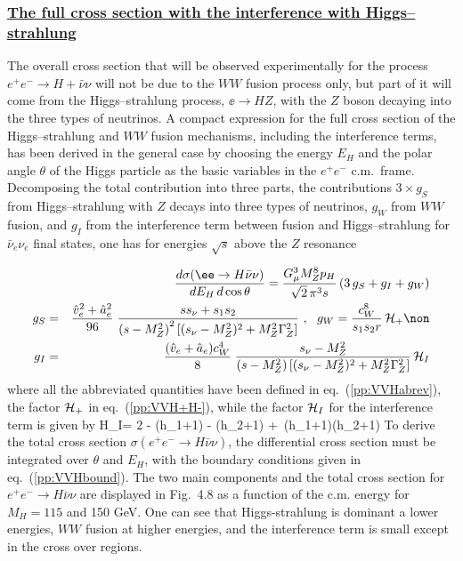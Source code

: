 \subsubsection*{\underline{The full cross section with the interference with 
Higgs--strahlung}}

The overall cross section that will be observed experimentally for  the process
$e^+e^- \to H\!+\!\bar\nu\nu$ will not be due to the $WW$ fusion process only,
but  part of it will come from the Higgs--strahlung  process,  $\ee \to HZ$,
with the $Z$ boson decaying into the three types of neutrinos.  A compact
expression for the full cross section of the Higgs--strahlung and $WW$ fusion 
mechanisms, including the interference terms,  has been derived in the general 
case by choosing the energy $E_H$ and the polar angle $\theta$ of the Higgs 
particle as the basic variables in the $e^+e^-$ c.m.\ frame. Decomposing  the
total contribution into three parts,  the contributions $3\times{g}_S$  from
Higgs--strahlung with $Z$ decays into three types of neutrinos, ${g}_W$
from $WW$ fusion, and ${g}_I$ from the interference term between  fusion
and Higgs--strahlung for $\bar\nu_e\nu_e$ final states, one has  for energies
$\sqrt{s}$ above the $Z$ resonance \cite{VVH-Altarelli,VVH-Kilian}

\begin{eqnarray}
&&  \frac{d\sigma(\ee \to H\bar\nu\nu)}{dE_H\,d\cos\theta}
  = \frac{G_\mu^3 M_Z^8p_H}{\sqrt2\,\pi^3s}
  \left(3\,g_S + g_I + g_W \right) \\
g_S &=& \frac{\hat{v}_e^2+\hat{a}_e^2}{96}\; \frac{ss_\nu + s_1s_2}
{\left(s-M_Z^2\right)^2 \left[(s_\nu-M_Z^2)^2 + M_Z^2\Gamma_Z^2\right]} \ , \ \
g_W= \frac{c^8_W}{s_1 s_2 r} \, {\cal H}_+ \non   \\
g_I &=& \frac{(\hat{v}_e+\hat{a}_e)c_W^4}{8}\; \frac{s_\nu-M_Z^2}
{\left(s-M_Z^2\right) \left[(s_\nu-M_Z^2)^2 + M_Z^2\Gamma_Z^2\right]}
\, {\cal H}_I
\end{eqnarray}
where all the abbreviated quantities have been defined in 
eq.~(\ref{pp:VVHabrev}), the factor ${\cal H}_+$ in eq.~(\ref{pp:VVH+H-}), 
while the factor ${\cal H}_I$ for the interference term is given by
\beq
{\cal H}_I= 2 - (h_1+1)\log{}
             - (h_2+1)\log{}
           +\, (h_1+1)(h_2+1)
\eeq
To derive the total cross section $\sigma(e^+e^-\to H\bar\nu\nu)$, the
differential cross section must be integrated over $\theta$ and $E_H$, with the
boundary conditions given in eq.~(\ref{pp:VVHbound}). The two main components 
and the total cross section for $e^+e^-\to H\bar\nu\nu$ are displayed in 
Fig.~4.8 as a function of the c.m. energy  for $M_H=115$ and 150 GeV. 
One can see that Higgs-strahlung is dominant a lower energies, $WW$ fusion at
higher energies, and the  interference term is small except in the cross over 
regions. \s

